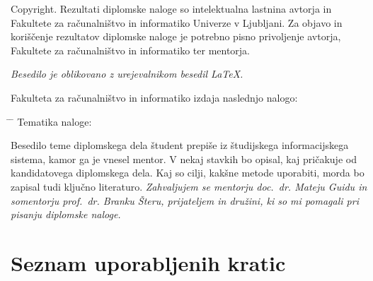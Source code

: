 \documentclass[a4paper, 12pt]{book}
\newcommand{\clearemptydoublepage}{\newpage{\pagestyle{empty}\cleardoublepage}}
\begin{document}
\noindent
{\sc Copyright}. 
Rezultati diplomske naloge so intelektualna lastnina avtorja in Fakultete za računalništvo in informatiko Univerze v Ljubljani.
Za objavo in koriščenje rezultatov diplomske naloge je potrebno pisno privoljenje avtorja, Fakultete za računalništvo in informatiko ter mentorja.

\begin{center}
\mbox{}\vfill
\emph{Besedilo je oblikovano z urejevalnikom besedil \LaTeX.}
\end{center}
\clearemptydoublepage

\thispagestyle{empty}
\vspace*{4cm}

\noindent
Fakulteta za računalništvo in informatiko izdaja naslednjo nalogo:
\medskip
\begin{tabbing}
\hspace{32mm}\= \hspace{6cm} \= \kill
Tematika naloge:
\end{tabbing}
Besedilo teme diplomskega dela študent prepiše iz študijskega informacijskega sistema, kamor ga je vnesel mentor. V nekaj stavkih bo opisal, kaj pričakuje od kandidatovega diplomskega dela. Kaj so cilji, kakšne metode uporabiti, morda bo zapisal tudi ključno literaturo.
\vspace{15mm}
\vspace{2cm}
\clearemptydoublepage
\thispagestyle{empty}\mbox{}\vfill\null\it%
\noindent
Zahvaljujem se mentorju doc.\ dr. Mateju Guidu in somentorju prof.\ dr. Branku Šteru, prijateljem in družini, ki so mi pomagali pri pisanju diplomske naloge.
\rm\normalfont
\clearemptydoublepage
\pagestyle{empty}
\def\thepage{}%
\tableofcontents{}
\clearemptydoublepage


\chapter*{Seznam uporabljenih kratic}  %

\end{document}
